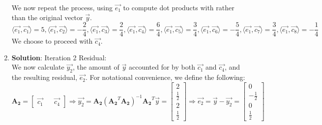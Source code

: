 \documentclass[11pt,letterpaper]{article}
\begin{document}
\begin{enumerate}
	    We now repeat the process, using $\vec{e_{1}}$ to compute dot products with rather than the original vector $\vec{y}$.
        \begin{equation*}
            \langle\vec{e_{1}},\vec{c_{1}}\rangle = 5,        \langle\vec{e_{1}},\vec{c_{2}}\rangle = -\frac{2}{4},
            \langle\vec{e_{1}},\vec{c_{3}}\rangle = \frac{2}{4},
            \langle\vec{e_{1}},\vec{c_{4}}\rangle = \frac{6}{4},
            \langle\vec{e_{1}},\vec{c_{5}}\rangle = \frac{3}{4},
            \langle\vec{e_{1}},\vec{c_{6}}\rangle = -\frac{5}{4},
            \langle\vec{e_{1}},\vec{c_{7}}\rangle = \frac{3}{4},
            \langle\vec{e_{1}},\vec{c_{8}}\rangle = -\frac{1}{4}
        \end{equation*}
        We choose to proceed with $\vec{c_{4}}$.
	\item \textbf{Solution}: Iteration 2 Residual: \\
	    We now calculate $\vec{y_{2}}$, the amount of $\vec{y}$ accounted for by both $\vec{c_{1}}$ and $\vec{c_{4}}$, and the resulting residual, $\vec{e_{2}}$. For notational convenience, we define the following:
        \begin{equation*}
            \boldsymbol{A_{2}} = \begin{bmatrix}
                \vec{c_{1}} && \vec{c_{4}}
            \end{bmatrix} \Rightarrow
            \vec{y_{2}} = \boldsymbol{A_{2}}(\boldsymbol{A_{2}}^T\boldsymbol{A_{2}})^{-1}\boldsymbol{A_{2}}^T\vec{y} = \begin{bmatrix}
                2 \\ \frac{1}{2} \\ 2 \\ \frac{1}{2}
            \end{bmatrix} \Rightarrow
            \vec{e_{2}} = \vec{y} - \vec{y_{2}} = \begin{bmatrix}
                0 \\ -\frac{1}{2} \\ 0 \\ \frac{1}{2}
            \end{bmatrix} 
        \end{equation*}
	    
\end{enumerate} 
\end{document}
